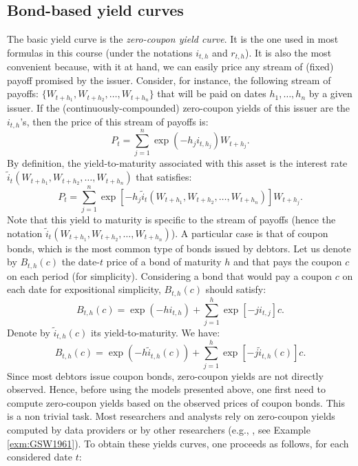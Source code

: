 \documentclass[
  12pt,
]{book}
\theoremstyle{definition}
\theoremstyle{definition}
\theoremstyle{definition}
\theoremstyle{definition}
\theoremstyle{remark}
\begin{document}
\hypertarget{bond-based-yield-curves}{%
\subsection{Bond-based yield curves}\label{bond-based-yield-curves}}

The basic yield curve is the \emph{zero-coupon yield curve}. It is the one used in most formulas in this course (under the notations \(i_{t,h}\) and \(r_{t,h}\)). It is also the most convenient because, with it at hand, we can easily price any stream of (fixed) payoff promised by the issuer. Consider, for instance, the following stream of payoffs: \(\{W_{t+h_1},W_{t+h_2},\dots,W_{t+h_n}\}\) that will be paid on dates \(h_1,\dots,h_n\) by a given issuer. If the (continuously-compounded) zero-coupon yields of this issuer are the \(i_{t,h}\)'s, then the price of this stream of payoffs is:
\[
P_t = \sum_{j=1}^n \exp(-h_j i_{t,h_j})W_{t+h_j}.
\]
By definition, the yield-to-maturity associated with this asset is the interest rate \(\tilde{i}_{t}(W_{t+h_1},W_{t+h_2},\dots,W_{t+h_n})\) that satisfies:
\[
P_t = \sum_{j=1}^n \exp\left[-h_j \tilde{i}_{t}(W_{t+h_1},W_{t+h_2},\dots,W_{t+h_n})\right]W_{t+h_j}.
\]
Note that this yield to maturity is specific to the stream of payoffs (hence the notation \(\tilde{i}_{t}(W_{t+h_1},W_{t+h_2},\dots,W_{t+h_n})\)). A particular case is that of coupon bonds, which is the most common type of bonds issued by debtors. Let us denote by \(B_{t,h}(c)\) the date-\(t\) price of a bond of maturity \(h\) and that pays the coupon \(c\) on each period (for simplicity). Considering a bond that would pay a coupon \(c\) on each date for expositional simplicity, \(B_{t,h}(c)\) should satisfy:
\begin{equation}
B_{t,h}(c) = \exp(-hi_{t,h}) + \sum_{j=1}^h \exp\left[-j i_{t,j}\right]c.\label{eq:couponBd}
\end{equation}
Denote by \(\tilde{i}_{t,h}(c)\) its yield-to-maturity. We have:
\[
B_{t,h}(c) = \exp(-h\tilde{i}_{t,h}(c)) + \sum_{j=1}^h \exp\left[-j \tilde{i}_{t,h}(c)\right]c.
\]
Since most debtors issue coupon bonds, zero-coupon yields are not directly observed. Hence, before using the models presented above, one first need to compute zero-coupon yields based on the observed prices of coupon bonds. This is a non trivial task. Most researchers and analysts rely on zero-coupon yields computed by data providers or by other researchers (e.g., \citet{GURKAYNAK20072291}, see Example \ref{exm:GSW1961}). To obtain these yields curves, one proceeds as follows, for each considered date \(t\):
\end{document}
